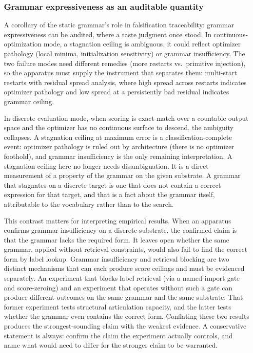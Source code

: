 \documentclass[
  11pt,
]{article}
\begin{document}
\subsubsection{Grammar expressiveness as an auditable
quantity}\label{grammar-expressiveness-as-an-auditable-quantity}

A corollary of the static grammar's role in falsification traceability:
grammar expressiveness can be audited, where a taste judgment
once stood. In continuous-optimization mode, a stagnation ceiling is
ambiguous, it could reflect optimizer pathology (local minima,
initialization sensitivity) or grammar insufficiency. The two
failure modes need different remedies (more restarts vs.~primitive
injection), so the apparatus must supply the instrument that separates
them: multi-start restarts with residual spread analysis, where high
spread across restarts indicates optimizer pathology and low spread at a
persistently bad residual indicates grammar ceiling.

In discrete evaluation mode, when scoring is exact-match over a countable
output space and the optimizer has no continuous surface to descend, the
ambiguity collapses. A stagnation ceiling at maximum error is a
classification-complete event: optimizer pathology is ruled out by
architecture (there is no optimizer foothold), and grammar insufficiency
is the only remaining interpretation. A stagnation ceiling here no longer
needs disambiguation. It is a direct measurement of a property of the
grammar on the given substrate. A grammar that stagnates on a discrete
target is one that does not contain a correct expression for that target,
and that is a fact about the grammar itself, attributable to the
vocabulary rather than to the search.

This contrast matters for interpreting empirical results. When an apparatus
confirms grammar insufficiency on a discrete substrate, the confirmed
claim is that the grammar lacks the required form. It leaves open whether
the same grammar, applied without retrieval constraints, would also fail
to find the correct form by label lookup. Grammar insufficiency and
retrieval blocking are two distinct mechanisms that can each produce score
ceilings and must be evidenced separately. An experiment that blocks label
retrieval (via a named-import gate and score-zeroing) and an experiment
that operates without such a gate can produce different outcomes on the
same grammar and the same substrate. That former experiment tests
structural articulation capacity, and the latter tests whether the grammar
even contains the correct form. Conflating these two results produces the
strongest-sounding claim with the weakest evidence. A conservative
statement is always: confirm the claim the experiment actually controls,
and name what would need to differ for the stronger claim to be warranted.
\end{document}
